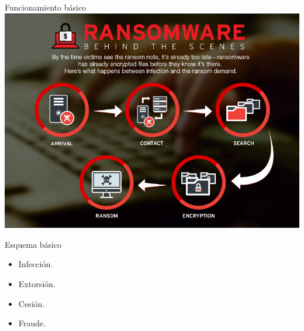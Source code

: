 \documentclass[10pt]{beamer}
\begin{document}
\begin{frame}[fragile]{Funcionamiento básico}
	\centering
	\includegraphics[scale=0.25]{./Imagenes/ransomware2.jpg}
	\pause
	\begin{block}{Esquema básico}
		\begin{itemize}
			\item Infección.
			\pause
			\item Extorsión.
			\pause
			\item Cesión.
			\pause
			\item Fraude.
		\end{itemize}
	\end{block}
\end{frame}
\end{document}
